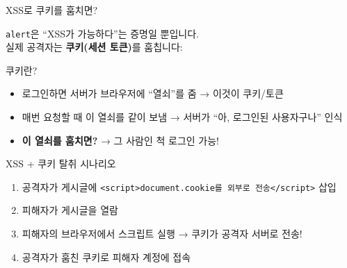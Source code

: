 \documentclass[aspectratio=169,10pt]{beamer}
\newcommand{\hlt}[1]{\textcolor{accent}{\textbf{#1}}}
\begin{document}
\begin{frame}{XSS로 쿠키를 훔치면?}

\texttt{alert}은 ``XSS가 가능하다''는 증명일 뿐입니다.\\
실제 공격자는 \hlt{쿠키(세션 토큰)}를 훔칩니다:

\vspace{0.3em}
\begin{block}{쿠키란?}
\begin{itemize}
    \item 로그인하면 서버가 브라우저에 ``열쇠''를 줌 → 이것이 쿠키/토큰
    \item 매번 요청할 때 이 열쇠를 같이 보냄 → 서버가 ``아, 로그인된 사용자구나'' 인식
    \item \hlt{이 열쇠를 훔치면?} → 그 사람인 척 로그인 가능!
\end{itemize}
\end{block}

\vspace{0.3em}
\begin{block}{XSS + 쿠키 탈취 시나리오}
\begin{enumerate}
    \item 공격자가 게시글에 \texttt{<script>document.cookie를 외부로 전송</script>} 삽입
    \item 피해자가 게시글을 열람
    \item 피해자의 브라우저에서 스크립트 실행 → 쿠키가 공격자 서버로 전송!
    \item 공격자가 훔친 쿠키로 피해자 계정에 접속
\end{enumerate}
\end{block}
\end{frame}
\end{document}
